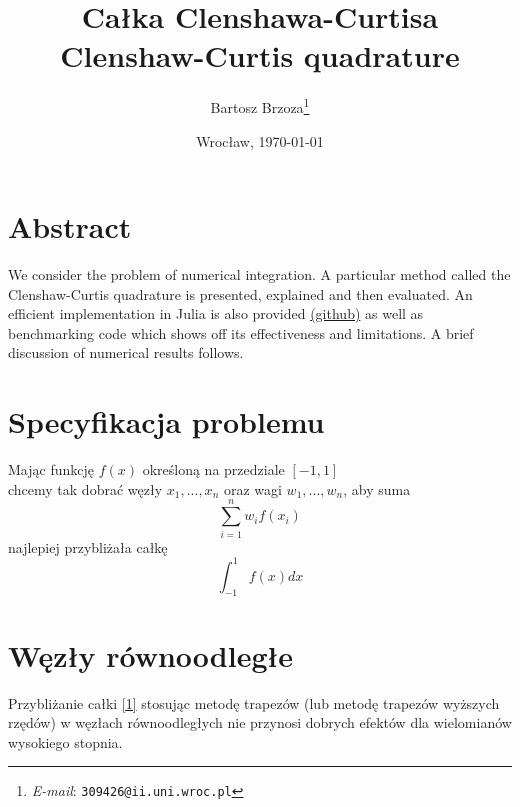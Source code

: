 \documentclass[11pt,wide]{mwart}
\begin{document}
\date{Wrocław, \today}
\title{\LARGE\textbf{Całka Clenshawa-Curtisa}\\Clenshaw-Curtis quadrature}
\author{Bartosz Brzoza\thanks{\textit{E-mail}: \texttt{309426@ii.uni.wroc.pl}}}
\maketitle

\section{Abstract}
We consider the problem of numerical integration.
A particular method called the Clenshaw-Curtis quadrature is presented,
explained and then evaluated. An efficient implementation in Julia
is also provided \href{https://github.com/nerkulec/ClenshawCurtis/}{(github)} as well as benchmarking code which shows off its effectiveness and limitations.
A brief discussion of numerical results follows.

\section{Specyfikacja problemu}
Mając funkcję $f(x)$ określoną na przedziale $[-1,1]$\\
chcemy tak dobrać węzły $x_1, ..., x_n$ oraz wagi $w_1, ..., w_n$, aby suma
$$\sum_{i=1}^n w_i f(x_i)$$
najlepiej przybliżała całkę
\begin{equation}
    \int_{-1}^1 f(x) dx \label{1}
\end{equation}

\section{Węzły równoodległe}
Przybliżanie całki \eqref{1} stosując metodę trapezów (lub metodę trapezów wyższych rzędów)
w węzłach równoodległych nie przynosi dobrych efektów dla wielomianów wysokiego stopnia.
\end{document}
